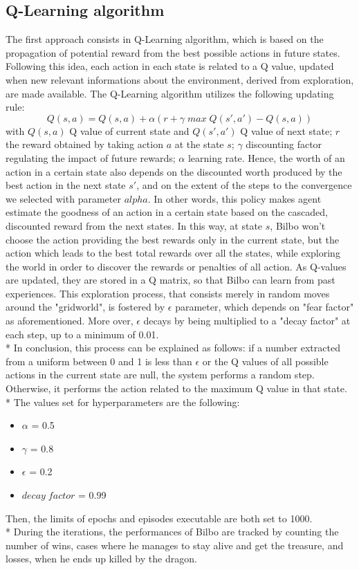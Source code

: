 \subsection{Q-Learning algorithm}
The first approach consists in Q-Learning algorithm, which is based on the propagation of potential reward from the best possible actions in future states. Following this idea, each action in each state is related to a Q value, updated when new relevant informations about the environment, derived from exploration, are made available. The Q-Learning algorithm utilizes the following updating rule:
$$Q(s,a)=Q(s,a)+\alpha(r+\gamma\;max\;Q(s',a') - Q(s,a))$$
with $Q(s,a)$ Q value of current state and $Q(s',a')$ Q value of next state; $r$ the reward obtained by taking action $a$ at the state $s$; $\gamma$ discounting factor regulating the impact of future rewards; $\alpha$ learning rate. Hence, the worth of an action in a certain state also depends on the discounted worth produced by the best action in the next state $s'$, and on the extent of the steps to the convergence we selected with parameter $alpha$. In other words, this policy makes agent estimate the goodness of an action in a certain state based on the cascaded, discounted reward from the next states. In this way, at state $s$, Bilbo won't choose the action providing the best rewards only in the current state, but the action which leads to the best total rewards over all the states, while exploring the world in order to discover the rewards or penalties of all action. As Q-values are updated, they are stored in a Q matrix, so that Bilbo can learn from past experiences. This exploration process, that consists merely in random moves around the "gridworld", is fostered by $\epsilon$ parameter, which depends on "fear factor" as aforementioned. More over, $\epsilon$ decays by being multiplied to a "decay factor" at each step, up to a minimum of 0.01.\\*
In conclusion, this process can be explained as follows: if a number extracted from a uniform between 0 and 1 is less than $\epsilon$ or the Q values of all possible actions in the current state are null, the system performs a random step. Otherwise, it performs the action related to the maximum Q value in that state.\\*
The values set for hyperparameters are the following:
\begin{itemize}
  \item $\alpha$ = 0.5
  \item $\gamma$ = 0.8
  \item $\epsilon$ = 0.2
  \item $decay\;factor$ = 0.99
\end{itemize} 
Then, the limits of epochs and episodes executable are both set to 1000.\\*
During the iterations, the performances of Bilbo are tracked by counting the number of wins, cases where he manages to stay alive and get the treasure, and losses, when he ends up killed by the dragon.

